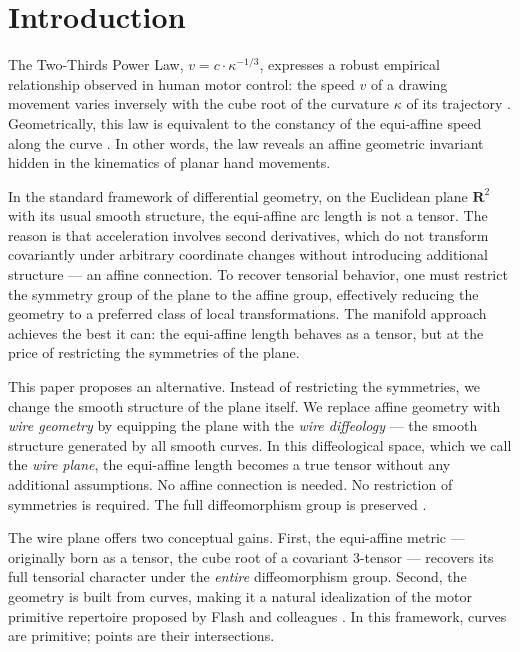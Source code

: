 \documentclass[10pt,letterpaper,reqno]{amsart}
\newcommand{\RR}{\mathbf{R}}
\begin{document}
  \section*{Introduction}
  
  The Two-Thirds Power Law,
  \(v = c \cdot \kappa^{-1/3}\),
  expresses a robust empirical relationship observed in human motor control:
  the speed \(v\) of a drawing movement varies inversely with the cube root
  of the curvature \(\kappa\) of its trajectory \cite{LTV83}.
  Geometrically,
  this law is equivalent to the constancy of the equi-affine speed along the curve
  \cite{PS97,FH07}.
  In other words, the law reveals an affine geometric invariant hidden
  in the kinematics of planar hand movements.
  
  In the standard framework of differential geometry,
  on the Euclidean plane $\RR^2$ with its usual smooth structure,
  the equi-affine arc length is not a tensor.
  The reason is that acceleration involves second derivatives,
  which do not transform covariantly under arbitrary coordinate changes
  without introducing additional structure — an affine connection.
  To recover tensorial behavior,
  one must restrict the symmetry group of the plane to the affine group,
  effectively reducing the geometry to a preferred class of local transformations.
  The manifold approach achieves the best it can:
  the equi-affine length behaves as a tensor,
  but at the price of restricting the symmetries of the plane.
  
  This paper proposes an alternative.
  Instead of restricting the symmetries,
  we change the smooth structure of the plane itself.
  We replace affine geometry with \emph{wire geometry} by  equipping the plane with the \emph{wire diffeology}
  --- the smooth structure generated by all smooth curves.
  In this diffeological space,
  which we call the \emph{wire plane},
  the equi-affine length becomes a true tensor without any additional assumptions.
  No affine connection is needed.
  No restriction of symmetries is required.
  The full diffeomorphism group is preserved \cite{PIZ26}.
  
  The wire plane offers two conceptual gains.
  First, the equi-affine metric --- originally born as a tensor,
  the cube root of a covariant $3$-tensor ---
  recovers its full tensorial character under the \emph{entire} diffeomorphism group.
  Second, the geometry is built from curves,
  making it a natural idealization of the motor primitive repertoire
  proposed by Flash and colleagues \cite{FH05}.
  In this framework, curves are primitive;
  points are their intersections.
  
\end{document}
